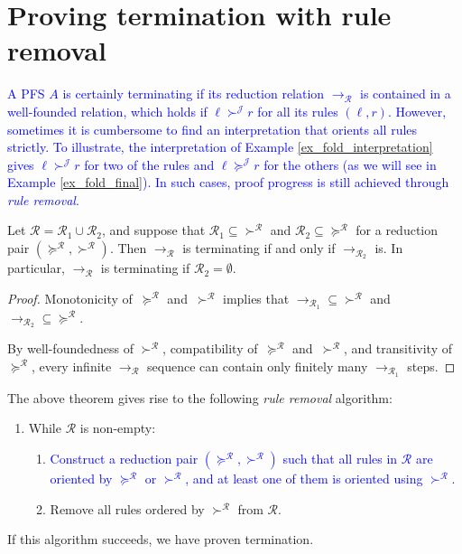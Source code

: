 \documentclass[a4paper,UKenglish,cleveref,autoref,numberwithinsect]{lipics-v2019}
\theoremstyle{definition}
\newcommand{\Rules}{\mathcal{R}}
\newcommand{\arr}[1]{\longrightarrow_{#1}}
\newcommand{\Termmap}{\mathcal{J}}
\newcommand{\succinterpret}{\succ^{\Termmap}}
\newcommand{\succeqinterpret}{\succeq^{\Termmap}}
\newcommand{\CKchange}[1]{\textcolor{blue}{#1}}
\begin{document}
\section{Proving termination with rule removal}\label{sec_rule_removal}

\CKchange{A PFS $A$ is certainly terminating if its reduction relation
$\arr{\Rules}$ is contained in a well-founded relation, which holds if
$\ell \succinterpret r$ for all its rules $(\ell,r)$.  However,
sometimes it is cumbersome to find an interpretation that orients all
rules strictly. To illustrate, the interpretation of Example
\ref{ex_fold_interpretation} gives $\ell \succinterpret r$ for two of
the rules and $\ell \succeqinterpret r$ for the others (as we will see
in Example \ref{ex_fold_final}). In such cases, proof progress is still
achieved through \emph{rule removal}.}

\begin{theorem}\label{thm:ruleremove}
  Let $\Rules = \Rules_1 \cup \Rules_2$, and suppose that
  $\Rules_1\subseteq{\succ^\Rules}$ and
  $\Rules_2\subseteq{\succeq^\Rules}$ for a reduction pair
  $(\succeq^\Rules,\succ^\Rules)$. Then $\arr{\Rules}$ is terminating
  if and only if $\arr{\Rules_2}$ is. In particular, $\arr{\Rules}$ is
  terminating if $\Rules_2 = \emptyset$.
\end{theorem}

\begin{proof}
  Monotonicity of~$\succeq^\Rules$ and~$\succ^\Rules$ implies that
  ${\arr{\Rules_1}}\subseteq{\succ^\Rules}$ and
  ${\arr{\Rules_2}}\subseteq{\succeq^\Rules}$.

  By well-foundedness of $\succ^\Rules$, compatibility
  of~$\succeq^\Rules$ and~$\succ^\Rules$, and transitivity
  of~$\succeq^\Rules$, every infinite $\arr{\Rules}$ sequence can
  contain only finitely many $\arr{\Rules_1}$ steps.
\end{proof}

The above theorem gives rise to the following \emph{rule removal}
algorithm:
\begin{enumerate}
\item While $\Rules$ is non-empty:
  \begin{enumerate}
  \item \CKchange{Construct a reduction pair $(\succeq^\Rules,\succ^\Rules)$
    such that all rules in $\Rules$ are oriented by $\succeq^\Rules$ or
    $\succ^\Rules$, and at least one of them is oriented using
    $\succ^\Rules$.}
  \item Remove all rules ordered by $\succ^\Rules$ from $\Rules$.
  \end{enumerate}
\end{enumerate}
If this algorithm succeeds, we have proven termination.
\end{document}
